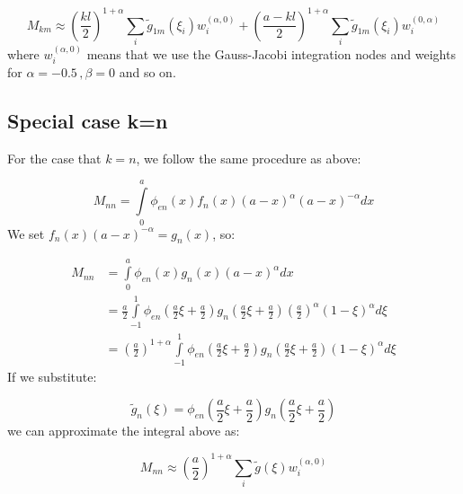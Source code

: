 \documentclass[12pt,letterpaper]{article}
\theoremstyle{definition}
\numberwithin{equation}{subsection}
\begin{document}
\begin{equation}
    M_{km} \approx \left(\frac{kl}{2}\right)^{1+\alpha} \sum_{i}\tilde g_{1m}(\xi_i) w_i^{(\alpha,0)}+ \left(\frac{a-kl}{2}\right)^{1 + \alpha} \sum_i\tilde g_{1m}(\xi_i) w_i^{(0,\alpha)}
\end{equation}
where $w_i^{(\alpha,0)}$ means that we use the Gauss-Jacobi integration nodes and weights for $\alpha=-0.5 \, , \beta=0$ and so on.

\subsection*{Special case k=n}

For the case that $k=n$, we follow the same procedure as above:

\begin{equation}
  M_{nn} = \int\limits_{0}^{a} \phi_{en}(x) f_{n}(x) (a-x)^{\alpha} (a-x)^{-\alpha}dx
\end{equation}
We set $f_{n}(x) (a-x)^{-\alpha} = g_n(x)$, so:

\begin{align*}
    M_{nn} &= \int\limits_{0}^{a} \phi_{en}(x) g_n(x)(a-x)^{\alpha}dx \\
    &= \frac{a}{2} \int\limits_{-1}^{1} \phi_{en} \left(\frac{a}{2}\xi + \frac{a}{2}\right) g_n \left(\frac{a}{2}\xi + \frac{a}{2}\right) \left(\frac{a}{2}\right)^{\alpha} (1-\xi)^{\alpha}d\xi \\
    &=\left(\frac{a}{2}\right)^{1+\alpha} \int\limits_{-1}^{1}\phi_{en} \left(\frac{a}{2}\xi + \frac{a}{2}\right) g_n \left(\frac{a}{2}\xi + \frac{a}{2}\right) (1-\xi)^{\alpha}d\xi
\end{align*}
If we substitute:

\begin{equation}
    \tilde g_n(\xi) = \phi_{en}\left(\frac{a}{2}\xi + \frac{a}{2}\right)g_n\left(\frac{a}{2}\xi + \frac{a}{2}\right)
\end{equation}
we can approximate the integral above as:

\begin{equation}
    M_{nn} \approx \left(\frac{a}{2}\right)^{1+\alpha} \sum_i \tilde g(\xi) w_i^{(\alpha, 0)}
\end{equation}
\end{document}

